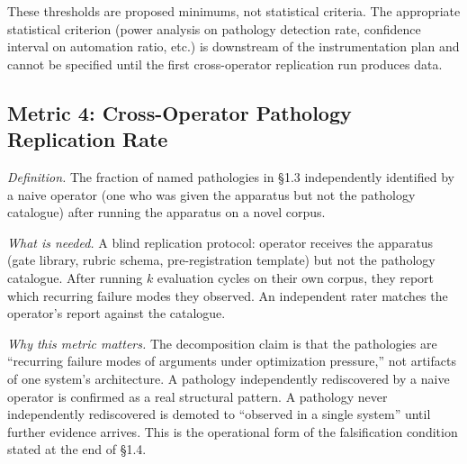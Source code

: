 \documentclass[11pt]{article}
\begin{document}
These thresholds are proposed minimums, not statistical criteria. The appropriate statistical criterion (power analysis on pathology detection rate, confidence interval on automation ratio, etc.) is downstream of the instrumentation plan and cannot be specified until the first cross-operator replication run produces data.

\subsection*{Metric 4: Cross-Operator Pathology Replication Rate}

\emph{Definition.} The fraction of named pathologies in \S1.3 independently identified by a naive operator (one who was given the apparatus but not the pathology catalogue) after running the apparatus on a novel corpus.

\emph{What is needed.} A blind replication protocol: operator receives the apparatus (gate library, rubric schema, pre-registration template) but not the pathology catalogue. After running $k$ evaluation cycles on their own corpus, they report which recurring failure modes they observed. An independent rater matches the operator's report against the catalogue.

\emph{Why this metric matters.} The decomposition claim is that the pathologies are ``recurring failure modes of arguments under optimization pressure,'' not artifacts of one system's architecture. A pathology independently rediscovered by a naive operator is confirmed as a real structural pattern. A pathology never independently rediscovered is demoted to ``observed in a single system'' until further evidence arrives. This is the operational form of the falsification condition stated at the end of \S1.4.
\end{document}
